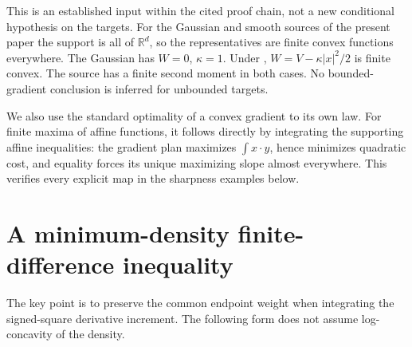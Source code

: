 \documentclass[11pt]{article}
\numberwithin{equation}{section}
\theoremstyle{remark}\newtheorem{remark}[theorem]{Remark}
\newcommand{\R}{\mathbb R}\newcommand{\E}{\mathbb E}
\begin{document}
This is an established input within the cited proof chain, not a new conditional hypothesis on the targets. For the Gaussian and smooth sources of the present paper the support is all of $\R^d$, so the representatives are finite convex functions everywhere. The Gaussian has $W=0$, $\kappa=1$. Under , $W=V-\kappa|x|^2/2$ is finite convex. The source has a finite second moment in both cases. No bounded-gradient conclusion is inferred for unbounded targets.

We also use the standard optimality of a convex gradient to its own law. For finite maxima of affine functions, it follows directly by integrating the supporting affine inequalities: the gradient plan maximizes $\int x\cdot y$, hence minimizes quadratic cost, and equality forces its unique maximizing slope almost everywhere. This verifies every explicit map in the sharpness examples below.

\section{A minimum-density finite-difference inequality}\label{sec:minimum}
The key point is to preserve the common endpoint weight when integrating the signed-square derivative increment. The following form does not assume log-concavity of the density.
\end{document}
